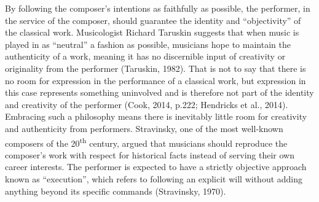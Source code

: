 \documentclass[authordate, empirical, issue]{jote-new-article}
\begin{document}
By following the composer's intentions as faithfully as possible, the performer, in the service of the composer, should guarantee the identity and “objectivity” of the classical work. Musicologist Richard Taruskin suggests that when music is played in as “neutral” a fashion as possible, musicians hope to maintain the authenticity of a work, meaning it has no discernible input of creativity or originality from the performer (Taruskin, 1982). That is not to say that there is no room for expression in the performance of a classical work, but expression in this case represents something uninvolved and is therefore not part of the identity and creativity of the performer (Cook, 2014, p.222; Hendricks et al., 2014). Embracing such a philosophy means there is inevitably little room for creativity and authenticity from performers. Stravinsky, one of the most well-known composers of the 20\textsuperscript{th} century, argued that musicians should reproduce the composer's work with respect for historical facts instead of serving their own career interests. The performer is expected to have a strictly objective approach known as “execution”, which refers to following an explicit will without adding anything beyond its specific commands (Stravinsky, 1970).
\end{document}
